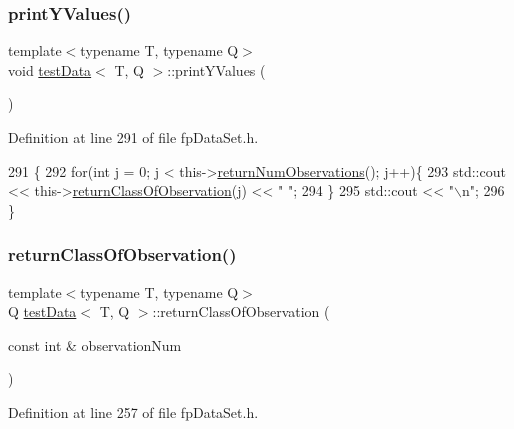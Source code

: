 \subsubsection{\texorpdfstring{print\+Y\+Values()}{printYValues()}}
{\footnotesize\ttfamily template$<$typename T, typename Q$>$ \\
void \hyperlink{classtestData}{test\+Data}$<$ T, Q $>$\+::print\+Y\+Values (\begin{DoxyParamCaption}{ }\end{DoxyParamCaption})\hspace{0.3cm}{\ttfamily [inline]}}



Definition at line 291 of file fp\+Data\+Set.\+h.


\begin{DoxyCode}
291                            \{
292             \textcolor{keywordflow}{for}(\textcolor{keywordtype}{int} j = 0; j < this->\hyperlink{classtestData_a7b7ea4d5b03144b691e909730d70ce62}{returnNumObservations}(); j++)\{
293                 std::cout << this->\hyperlink{classtestData_a32ce8f625023ea9a9c0a7aff224c75cc}{returnClassOfObservation}(j) << \textcolor{stringliteral}{" "};
294             \}
295             std::cout << \textcolor{stringliteral}{"\(\backslash\)n"};
296         \}
\end{DoxyCode}
\mbox{\label{classtestData_a32ce8f625023ea9a9c0a7aff224c75cc}} 
\subsubsection{\texorpdfstring{return\+Class\+Of\+Observation()}{returnClassOfObservation()}}
{\footnotesize\ttfamily template$<$typename T, typename Q$>$ \\
Q \hyperlink{classtestData}{test\+Data}$<$ T, Q $>$\+::return\+Class\+Of\+Observation (\begin{DoxyParamCaption}\item[{const int \&}]{observation\+Num }\end{DoxyParamCaption})\hspace{0.3cm}{\ttfamily [inline]}}



Definition at line 257 of file fp\+Data\+Set.\+h.


